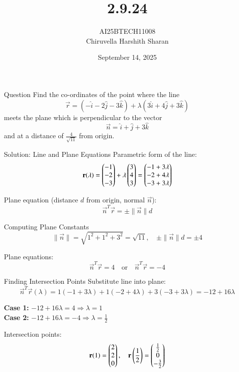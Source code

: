 \documentclass{beamer}
\title
{2.9.24}
\date{September 14, 2025}
\author 
{AI25BTECH11008\\Chiruvella Harshith Sharan}
\begin{document}
\frame{\titlepage}

\begin{frame}{Question}
Find the co-ordinates of the point where the line
\[
\vec{r} = (-\hat{i}-2\hat{j}-3\hat{k}) + \lambda(3\hat{i}+4\hat{j}+3\hat{k})
\]
meets the plane which is perpendicular to the vector
\[
\vec{n} = \hat{i} + \hat{j} + 3\hat{k}
\]
and at a distance of $\frac{4}{\sqrt{11}}$ from origin.
\end{frame}

\begin{frame}{Solution: Line and Plane Equations}
Parametric form of the line:
\begin{equation}
\mathbf{r}(\lambda) = \begin{pmatrix}-1 \\ -2 \\ -3\end{pmatrix} + \lambda \begin{pmatrix}3 \\ 4 \\ 3\end{pmatrix} 
= \begin{pmatrix}-1+3\lambda \\ -2+4\lambda \\ -3+3\lambda\end{pmatrix}
\end{equation}

Plane equation (distance $d$ from origin, normal $\vec{n}$):
\begin{equation}
\vec{n}^T \vec{r} = \pm \|\vec{n}\| d
\end{equation}
\end{frame}

\begin{frame}{Computing Plane Constants}
\begin{equation}
\|\vec{n}\| = \sqrt{1^2 + 1^2 + 3^2} = \sqrt{11}, \quad
\pm \|\vec{n}\| d = \pm 4
\end{equation}

Plane equations:
\begin{equation}
\vec{n}^T \vec{r} = 4 \quad \text{or} \quad \vec{n}^T \vec{r} = -4
\end{equation}
\end{frame}

\begin{frame}{Finding Intersection Points}
Substitute line into plane:
\begin{equation}
\vec{n}^T \vec{r}(\lambda) = 1(-1+3\lambda) + 1(-2+4\lambda) + 3(-3+3\lambda) = -12 + 16\lambda
\end{equation}

\textbf{Case 1:} $-12 + 16\lambda = 4 \Rightarrow \lambda = 1$ \\
\textbf{Case 2:} $-12 + 16\lambda = -4 \Rightarrow \lambda = \frac{1}{2}$

Intersection points:
\begin{equation}
\mathbf{r}(1) = \begin{pmatrix}2 \\ 2 \\ 0\end{pmatrix}, \quad
\mathbf{r}\left(\frac{1}{2}\right) = \begin{pmatrix}\frac{1}{2} \\ 0 \\ -\frac{3}{2}\end{pmatrix}
\end{equation}
\end{frame}
\end{document}
